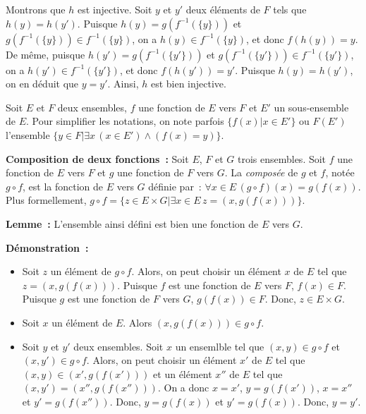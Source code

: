     Montrons que $h$ est injective. 
    Soit $y$ et $y'$ deux éléments de $F$ tels que $h(y) = h(y')$. 
    Puisque $h(y) = g (f^{-1}(\lbrace y \rbrace))$ et $g (f^{-1}(\lbrace y \rbrace)) \in f^{-1}(\lbrace y \rbrace)$, on a $h(y) \in f^{-1}(\lbrace y \rbrace)$, et donc $f(h(y)) = y$.
    De même, puisque $h(y') = g (f^{-1}(\lbrace y' \rbrace))$ et $g (f^{-1}(\lbrace y' \rbrace)) \in f^{-1}(\lbrace y' \rbrace)$, on a $h(y') \in f^{-1}(\lbrace y' \rbrace)$, et donc $f(h(y')) = y'$.
    Puisque $h(y) = h(y')$, on en déduit que $y = y'$. 
    Ainsi, $h$ est bien injective. 

   \done 

\medskip

Soit $E$ et $F$ deux ensembles, $f$ une fonction de $E$ vers $F$ et $E'$ un sous-ensemble de $E$. 
Pour simplifier les notations, on note parfois $\lbrace f(x) \vert x \in E' \rbrace$ ou $F(E')$ l'ensemble $\lbrace y \in F \vert \exists x \, (x \in E') \wedge (f(x) = y) \rbrace$. 

\medskip

\noindent\textbf{Composition de deux fonctions :} Soit $E$, $F$ et $G$ trois ensembles. 
    Soit $f$ une fonction de $E$ vers $F$ et $g$ une fonction de $F$ vers $G$. 
    La \textit{composée} de $g$ et $f$, notée $g \circ f$, est la fonction de $E$ vers $G$ définie par : $\forall x \in E \, (g \circ f) (x) = g(f(x))$. 
    Plus formellement, $g \circ f = \lbrace z \in E \times G \vert \exists x \in E \, z = (x,g(f(x))) \rbrace$.

\medskip

\noindent\textbf{Lemme :} L'ensemble ainsi défini est bien une fonction de $E$ vers $G$.

\medskip

\noindent\textbf{Démonstration :} 
\begin{itemize}[nosep]
    \item Soit $z$ un élément de $g \circ f$. 
        Alors, on peut choisir un élément $x$ de $E$ tel que $z = (x,g(f(x)))$. 
        Puisque $f$ est une fonction de $E$ vers $F$, $f(x) \in F$.
        Puisque $g$ est une fonction de $F$ vers $G$, $g(f(x)) \in F$.
        Donc, $z \in E \times G$.
    \item Soit $x$ un élément de $E$. Alors $(x,g(f(x))) \in g \circ f$.
    \item Soit $y$ et $y'$ deux ensembles. 
        Soit $x$ un ensemlble tel que $(x,y) \in g \circ f$ et $(x,y') \in g \circ f$. 
        Alors, on peut choisir un élément $x'$ de $E$ tel que $(x,y) \in (x',g(f(x')))$ et un élément $x''$ de $E$ tel que $(x,y') = (x'',g(f(x'')))$. 
        On a donc $x = x'$, $y = g(f(x'))$, $x = x''$ et $y' = g(f(x''))$. 
        Donc, $y = g(f(x))$ et $y' = g(f(x))$. 
        Donc, $y = y'$.
\end{itemize}

